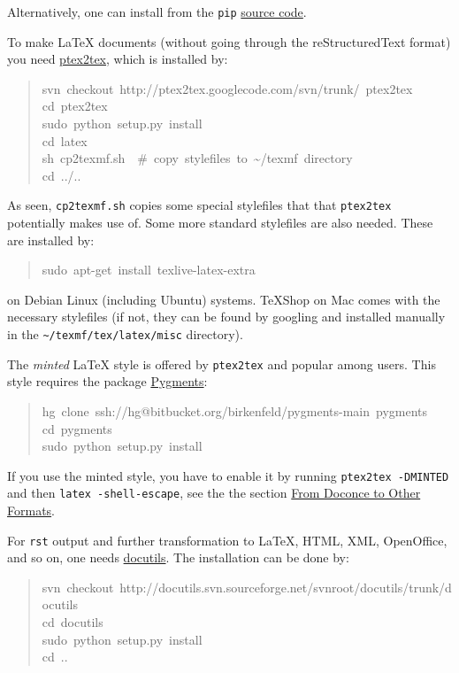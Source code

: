 \documentclass[a4paper]{article}
\begin{document}
Alternatively, one can install from the \texttt{pip} \href{http://pypi.python.org/pypi/pip}{source code}.

To make LaTeX
documents (without going through the reStructuredText format) you
need \href{http://code.google.com/p/ptex2tex}{ptex2tex}, which is
installed by:
%
\begin{quote}{\ttfamily \raggedright \noindent
svn~checkout~http://ptex2tex.googlecode.com/svn/trunk/~ptex2tex\\
cd~ptex2tex\\
sudo~python~setup.py~install\\
cd~latex\\
sh~cp2texmf.sh~~\#~copy~stylefiles~to~\textasciitilde{}/texmf~directory\\
cd~../..
}
\end{quote}

As seen, \texttt{cp2texmf.sh} copies some special stylefiles that
that \texttt{ptex2tex} potentially makes use of. Some more standard stylefiles
are also needed. These are installed by:
%
\begin{quote}{\ttfamily \raggedright \noindent
sudo~apt-get~install~texlive-latex-extra
}
\end{quote}

on Debian Linux (including Ubuntu) systems. TeXShop on Mac comes with
the necessary stylefiles (if not, they can be found by googling and installed
manually in the \texttt{\textasciitilde{}/texmf/tex/latex/misc} directory).

The \emph{minted} LaTeX style is offered by \texttt{ptex2tex} and popular among
users. This style requires the package \href{http://pygments.org}{Pygments}:
%
\begin{quote}{\ttfamily \raggedright \noindent
hg~clone~ssh://hg@bitbucket.org/birkenfeld/pygments-main~pygments\\
cd~pygments\\
sudo~python~setup.py~install
}
\end{quote}

If you use the minted style, you have to enable it by running
\texttt{ptex2tex -DMINTED} and then \texttt{latex -shell-escape}, see
the the section \hyperref[from-doconce-to-other-formats]{From Doconce to Other Formats}.

For \texttt{rst} output and further transformation to LaTeX, HTML, XML,
OpenOffice, and so on, one needs \href{http://docutils.sourceforge.net}{docutils}.
The installation can be done by:
%
\begin{quote}{\ttfamily \raggedright \noindent
svn~checkout~http://docutils.svn.sourceforge.net/svnroot/docutils/trunk/docutils\\
cd~docutils\\
sudo~python~setup.py~install\\
cd~..
}
\end{quote}
\end{document}

